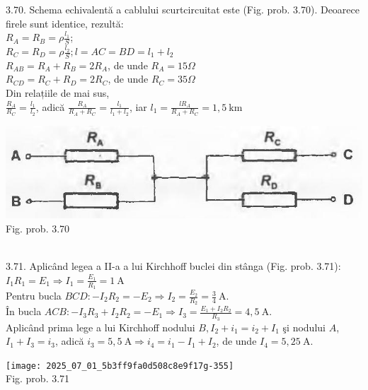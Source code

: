 3.70. Schema echivalentă a cablului scurtcircuitat este (Fig. prob. 3.70). Deoarece firele sunt identice, rezultă:\\ $R_{A}=R_{B}=\rho \frac{l_{1}}{S}$; \\ $R_{C}=R_{D}=\rho \frac{l_{2}}{S} ; l=A C=B D=l_{1}+l_{2}$\\ $R_{A B}=R_{A}+R_{B}=2 R_{A}$, de unde $R_{A}=15 \Omega$\\ $R_{C D}=R_{C}+R_{D}=2 R_{C}$, de unde $R_{C}=35 \Omega$\\ Din relațiile de mai sus,\\ $\frac{R_{A}}{R_{C}}=\frac{l_{1}}{l_{2}}$, adică $\frac{R_{A}}{R_{A}+R_{C}}=\frac{l_{1}}{l_{1}+l_{2}}$, iar $l_{1}=\frac{l R_{A}}{R_{A}+R_{C}}=1,5 \mathrm{~km}$\\ \begin{center} \includegraphics[max width=\textwidth]{images/2025_07_01_5b3ff9fa0d508c8e9f17g-354}\\ Fig. prob. 3.70 \end{center}\\

3.71. Aplicând legea a II-a a lui Kirchhoff buclei din stânga (Fig. prob. 3.71):\\ $I_{1} R_{1}=E_{1} \Rightarrow I_{1}=\frac{E_{1}}{R_{1}}=1 \mathrm{~A}$\\ Pentru bucla $B C D:-I_{2} R_{2}=-E_{2} \Rightarrow I_{2}=\frac{E_{2}}{R_{2}}=\frac{3}{4} \mathrm{~A}$.\\ În bucla $A C B:-I_{3} R_{3}+I_{2} R_{2}=-E_{1} \Rightarrow I_{3}=\frac{E_{1}+I_{2} R_{2}}{R_{3}}=4,5 \mathrm{~A}$.\\ Aplicând prima lege a lui Kirchhoff nodului $B, I_{2}+i_{1}=i_{2}+I_{1}$ şi nodului $A$,\\ $I_{1}+I_{3}=i_{3}$, adică $i_{3}=5,5 \mathrm{~A} \Rightarrow i_{4}=i_{1}-I_{1}+I_{2}$, de unde $I_{4}=5,25 \mathrm{~A}$.\\ \begin{center} \texttt{[image: 2025\_07\_01\_5b3ff9fa0d508c8e9f17g-355]}\\ Fig. prob. 3.71 \end{center}\\

